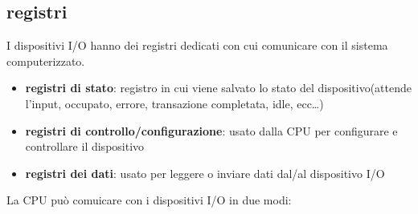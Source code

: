 \documentclass{article}
\begin{document}
    \subsection{registri}
         I dispositivi I/O hanno dei registri dedicati con cui comunicare con il sistema computerizzato.

        \begin{itemize}
            \item \textbf{registri di stato}:
            registro in cui viene salvato lo stato del dispositivo(attende l'input, occupato, errore, transazione completata, idle, ecc\ldots)

            \item \textbf{registri di controllo/configurazione}:
            usato dalla CPU per configurare e controllare il dispositivo

            \item \textbf{registri dei dati}:
            usato per leggere o inviare dati dal/al dispositivo I/O
        \end{itemize}
        La CPU può comuicare con i dispositivi I/O in due modi:
        
\end{document}
